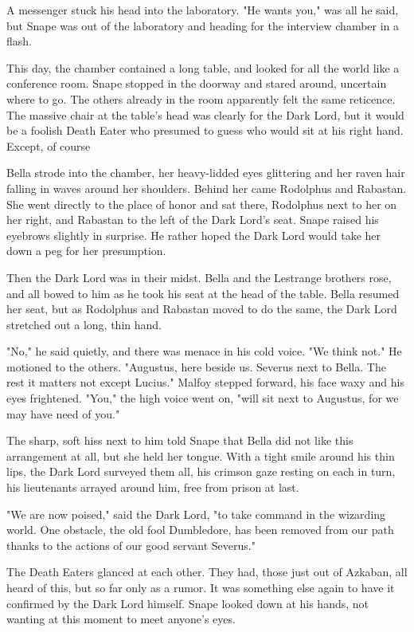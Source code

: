 A messenger stuck his head into the laboratory. "He wants you," was all he said, but Snape was out of the laboratory and heading for the interview chamber in a flash.

This day, the chamber contained a long table, and looked for all the world like a conference room. Snape stopped in the doorway and stared around, uncertain where to go. The others already in the room apparently felt the same reticence. The massive chair at the table's head was clearly for the Dark Lord, but it would be a foolish Death Eater who presumed to guess who would sit at his right hand. Except, of course{\el}

Bella strode into the chamber, her heavy-lidded eyes glittering and her raven hair falling in waves around her shoulders. Behind her came Rodolphus and Rabastan. She went directly to the place of honor and sat there, Rodolphus next to her on her right, and Rabastan to the left of the Dark Lord's seat. Snape raised his eyebrows slightly in surprise. He rather hoped the Dark Lord would take her down a peg for her presumption.

Then the Dark Lord was in their midst. Bella and the Lestrange brothers rose, and all bowed to him as he took his seat at the head of the table. Bella resumed her seat, but as Rodolphus and Rabastan moved to do the same, the Dark Lord stretched out a long, thin hand.

"No," he said quietly, and there was menace in his cold voice. "We think not." He motioned to the others. "Augustus, here beside us. Severus next to Bella. The rest it matters not except{\el} Lucius." Malfoy stepped forward, his face waxy and his eyes frightened. "You," the high voice went on, "will sit next to Augustus, for we may have need of you."

The sharp, soft hiss next to him told Snape that Bella did not like this arrangement at all, but she held her tongue. With a tight smile around his thin lips, the Dark Lord surveyed them all, his crimson gaze resting on each in turn, his lieutenants arrayed around him, free from prison at last.

"We are now poised," said the Dark Lord, "to take command in the wizarding world. One obstacle, the old fool Dumbledore, has been removed from our path thanks to the actions of our good servant Severus."

The Death Eaters glanced at each other. They had, those just out of Azkaban, all heard of this, but so far only as a rumor. It was something else again to have it confirmed by the Dark Lord himself. Snape looked down at his hands, not wanting at this moment to meet anyone's eyes.

